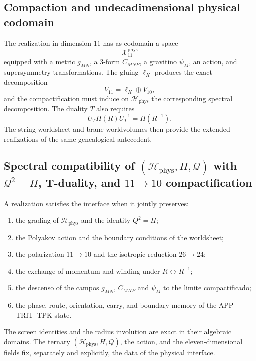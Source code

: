 \subsection{Compaction and undecadimensional physical codomain}

The realization in dimension \(11\) has as codomain a space
\[
 \mathcal X_{11}^{\mathrm{phys}}
\]
equipped with a metric \(g_{MN}\), a \(3\)-form \(C_{MNP}\), a gravitino
\(\psi_M\), an action, and supersymmetry transformations. The gluing
\(\ell_K\) produces the exact decomposition
\[
 V_{11}=\ell_K\oplus V_{10},
\]
and the compactification must induce on
\(\mathcal H_{\mathrm{phys}}\) the corresponding spectral decomposition.
The duality \(T\) also requires
\[
 U_T H(R)U_T^{-1}=H(R^{-1}).
\]
The string worldsheet and brane worldvolumes then provide the
extended realizations of the same genealogical antecedent.

\subsection{Spectral compatibility of \((\mathcal H_{\mathrm{phys}},H,\mathcal Q)\) with \(\mathcal Q^2=H\), T-duality, and \(11\to10\) compactification}

A realization satisfies the interface when it jointly preserves:
\begin{enumerate}
\item the grading of \(\mathcal H_{\mathrm{phys}}\) and the identity
      \(Q^2=H\);
\item the Polyakov action and the boundary conditions of the
      worldsheet;
\item the polarization \(11\to10\) and the isotropic reduction \(26\to24\);
\item the exchange of momentum and winding under \(R\leftrightarrow
      R^{-1}\);
\item the descenso of the campos \(g_{MN}\), \(C_{MNP}\) and \(\psi_M\) to the
      limite compactificado;
\item the phase, route, orientation, carry, and boundary memory of the
      APP--TRIT--TPK state.
\end{enumerate}
The screen identities and the radius involution are exact in their
algebraic domains. The ternary
\((\mathcal H_{\mathrm{phys}},H,Q)\), the action, and the eleven-dimensional fields
fix, separately and explicitly, the data of the
physical interface.
